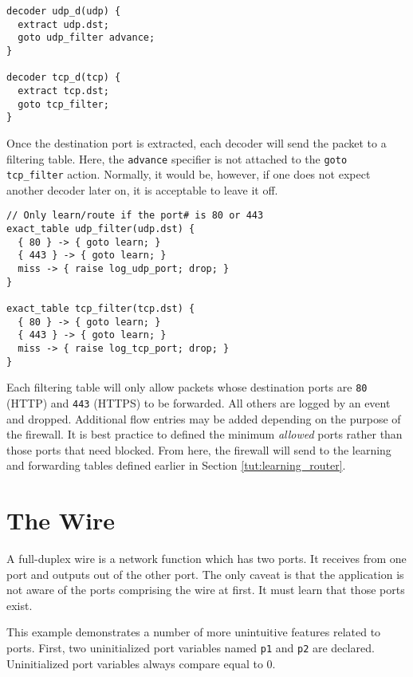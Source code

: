 \begin{codepage}
\begin{lstlisting}
decoder udp_d(udp) {
  extract udp.dst;
  goto udp_filter advance;
}

decoder tcp_d(tcp) {
  extract tcp.dst;
  goto tcp_filter;
}
\end{lstlisting}
\end{codepage}

Once the destination port is extracted, each decoder will send the packet to 
a filtering table. Here, the \texttt{advance} specifier is not attached to the 
\texttt{goto tcp\_filter} action. Normally, it would be, however, if one does 
not expect another decoder later on, it is acceptable to leave it off.

\begin{codepage}
\begin{lstlisting}
// Only learn/route if the port# is 80 or 443
exact_table udp_filter(udp.dst) {
  { 80 } -> { goto learn; }
  { 443 } -> { goto learn; }
  miss -> { raise log_udp_port; drop; }
}

exact_table tcp_filter(tcp.dst) {
  { 80 } -> { goto learn; }
  { 443 } -> { goto learn; }
  miss -> { raise log_tcp_port; drop; }
}
\end{lstlisting}
\end{codepage}

Each filtering table will only allow packets whose destination ports are \texttt{80} (HTTP) and \texttt{443} (HTTPS) to be forwarded. All others are logged by an event and dropped. Additional flow entries may be added depending on the purpose of the firewall. It is best practice to defined the minimum \textit{allowed} ports rather than those ports that need blocked. From here, the firewall will send to the learning and forwarding tables defined earlier in Section \ref{tut:learning_router}.

\section{The Wire} \label{tut:wire}

A full-duplex wire is a network function which has two ports. 
It receives from one port
and outputs out of the other port. The only caveat is that the application is
not aware of the ports comprising the wire at first. It must learn that those
ports exist.

This example demonstrates a number of more unintuitive features related to
ports. First, two uninitialized port variables named \texttt{p1} and
\texttt{p2} are declared. Uninitialized port variables always compare equal to 0.

